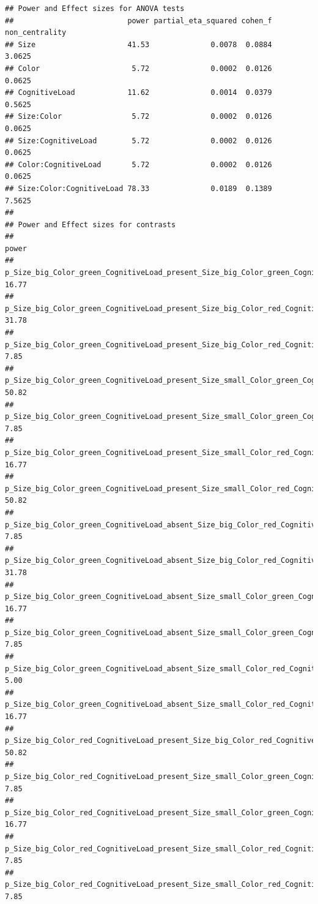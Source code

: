 \documentclass[]{book}
\begin{document}
\begin{verbatim}
## Power and Effect sizes for ANOVA tests
##                          power partial_eta_squared cohen_f non_centrality
## Size                     41.53              0.0078  0.0884         3.0625
## Color                     5.72              0.0002  0.0126         0.0625
## CognitiveLoad            11.62              0.0014  0.0379         0.5625
## Size:Color                5.72              0.0002  0.0126         0.0625
## Size:CognitiveLoad        5.72              0.0002  0.0126         0.0625
## Color:CognitiveLoad       5.72              0.0002  0.0126         0.0625
## Size:Color:CognitiveLoad 78.33              0.0189  0.1389         7.5625
## 
## Power and Effect sizes for contrasts
##                                                                                            power
## p_Size_big_Color_green_CognitiveLoad_present_Size_big_Color_green_CognitiveLoad_absent     16.77
## p_Size_big_Color_green_CognitiveLoad_present_Size_big_Color_red_CognitiveLoad_present      31.78
## p_Size_big_Color_green_CognitiveLoad_present_Size_big_Color_red_CognitiveLoad_absent        7.85
## p_Size_big_Color_green_CognitiveLoad_present_Size_small_Color_green_CognitiveLoad_present  50.82
## p_Size_big_Color_green_CognitiveLoad_present_Size_small_Color_green_CognitiveLoad_absent    7.85
## p_Size_big_Color_green_CognitiveLoad_present_Size_small_Color_red_CognitiveLoad_present    16.77
## p_Size_big_Color_green_CognitiveLoad_present_Size_small_Color_red_CognitiveLoad_absent     50.82
## p_Size_big_Color_green_CognitiveLoad_absent_Size_big_Color_red_CognitiveLoad_present        7.85
## p_Size_big_Color_green_CognitiveLoad_absent_Size_big_Color_red_CognitiveLoad_absent        31.78
## p_Size_big_Color_green_CognitiveLoad_absent_Size_small_Color_green_CognitiveLoad_present   16.77
## p_Size_big_Color_green_CognitiveLoad_absent_Size_small_Color_green_CognitiveLoad_absent     7.85
## p_Size_big_Color_green_CognitiveLoad_absent_Size_small_Color_red_CognitiveLoad_present      5.00
## p_Size_big_Color_green_CognitiveLoad_absent_Size_small_Color_red_CognitiveLoad_absent      16.77
## p_Size_big_Color_red_CognitiveLoad_present_Size_big_Color_red_CognitiveLoad_absent         50.82
## p_Size_big_Color_red_CognitiveLoad_present_Size_small_Color_green_CognitiveLoad_present     7.85
## p_Size_big_Color_red_CognitiveLoad_present_Size_small_Color_green_CognitiveLoad_absent     16.77
## p_Size_big_Color_red_CognitiveLoad_present_Size_small_Color_red_CognitiveLoad_present       7.85
## p_Size_big_Color_red_CognitiveLoad_present_Size_small_Color_red_CognitiveLoad_absent        7.85

\end{verbatim}
\end{document}
